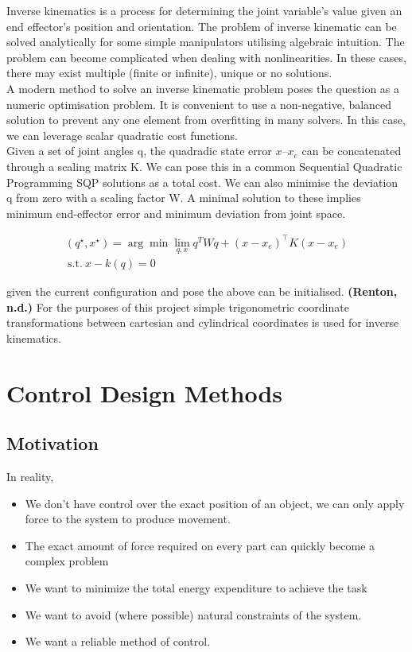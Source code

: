\documentclass{UoNMCHA}
\numberwithin{equation}{section}
\begin{document}
	Inverse kinematics is a process for determining the joint variable's value given an end effector's position and orientation. The problem of inverse kinematic can be solved analytically for some simple manipulators utilising algebraic intuition. The problem can become complicated when dealing with nonlinearities. In these cases, there may exist multiple (finite or infinite), unique or no solutions. \\
	A modern method to solve an inverse kinematic problem poses the question as a numeric optimisation problem. It is convenient to use a non-negative, balanced solution to prevent any one element from overfitting in many solvers. In this case, we can leverage scalar quadratic cost functions.  \\
	Given a set of joint angles q, the quadradic state error  $x–x_e$ can be concatenated through a scaling matrix K. We can pose this in a common Sequential Quadratic Programming SQP solutions as a total cost. We can also minimise the deviation q from zero with a scaling factor W. A minimal solution to these implies minimum end-effector error and minimum deviation from joint space.  
	
	
	
	\begin{gather*}
	\left(q^\star,x^\star\right)=\arg{\min \lim_{q,x}{q^{T}W}q}+\left(x-x_e\right)^\top K\left(x-x_e\right) \\
	\mathrm{\ s.t.\ }x-k\left(q\right)=0
	\end{gather*}
	
	given the current configuration and pose the above can be initialised. \textbf{(Renton, n.d.)}
	For the purposes of this project simple trigonometric coordinate transformations between cartesian and cylindrical coordinates is used for inverse kinematics.
	
	
	
	\section{Control Design Methods}
	
	\subsection{Motivation}
	
	In reality,
	\begin{itemize}
		\item We don’t have control over the exact position of an object, we can only apply force to the system to produce movement. 
		\item The exact amount of force required on every part can quickly become a complex problem 
		\item We want to minimize the total energy expenditure to achieve the task 
		\item We want to avoid (where possible) natural constraints of the system. 
		\item We want a reliable method of control. 	
	\end{itemize}
	
\end{document}
